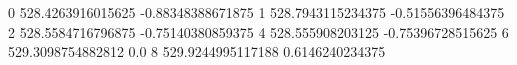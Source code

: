 0 528.4263916015625 -0.88348388671875
1 528.7943115234375 -0.51556396484375
2 528.5584716796875 -0.75140380859375
4 528.555908203125 -0.75396728515625
6 529.3098754882812 0.0
8 529.9244995117188 0.6146240234375
